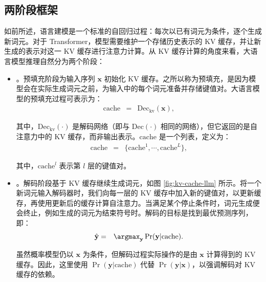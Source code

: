 \subsection{两阶段框架}
\label{sec:llm-inference-prefilling-and-decoding}

如前所述，语言建模是一个标准的自回归过程：每次以已有词元为条件，逐个生成新词元。对于 Transformer，模型需要维护一个存储历史表示的 KV 缓存，并让新生成的表示对这一 KV 缓存进行注意力计算。从 KV 缓存计算的角度来看，大语言模型推理自然分为两个阶段：

\begin{itemize}
\item \vspace{0.5em} 。预填充阶段为输入序列 $\mathbf{x}$ 初始化 KV 缓存。之所以称为预填充，是因为模型会在实际生成词元之前，为输入中的每个词元准备并存储键值对。大语言模型的预填充过程可表示为：
    \begin{eqnarray}
    \mathrm{cache} & = & \mathrm{Dec}_{\mathrm{kv}}(\mathbf{x}), \label{eq:prefilling-kv-cache}
    \end{eqnarray}

    \noindent 其中，$\mathrm{Dec}_{\mathrm{kv}}(\cdot)$ 是解码网络（即与 $\mathrm{Dec}(\cdot)$ 相同的网络），但它返回的是自注意力中的 KV 缓存，而非输出表示。$\mathrm{cache}$ 是一个列表，定义为：
    \begin{eqnarray}
    \mathrm{cache} & = & \{\mathrm{cache}^1,\cdots,\mathrm{cache}^L\},
    \end{eqnarray}

    \noindent 其中，$\mathrm{cache}^l$ 表示第 $l$ 层的键值对。

\item \vspace{0.3em} 。解码阶段基于 KV 缓存继续生成词元，如图 \ref{fig:kv-cache-llm} 所示。将一个新词元输入解码器时，我们向每一层的 KV 缓存中加入新的键值对，以更新缓存，再使用更新后的缓存计算自注意力。当满足某个停止条件时，词元生成便会终止，例如生成的词元为结束符号时。解码的目标是找到最优预测序列，即：
    \begin{eqnarray}
    \hat{\mathbf{y}} & = & \argmax_{\mathbf{y}} \Pr(\mathbf{y}|\mathrm{cache}). \label{eq:llm-argmax-kv-cache}
    \end{eqnarray}

    \noindent 虽然概率模型仍以 $\mathbf{x}$ 为条件，但解码过程实际操作的是由 $\mathbf{x}$ 计算得到的 KV 缓存。因此，这里使用 $\Pr(\mathbf{y}|\mathrm{cache})$ 代替 $\Pr(\mathbf{y}|\mathbf{x})$，以强调解码对 KV 缓存的依赖。
\end{itemize}
\vspace{0.5em}

